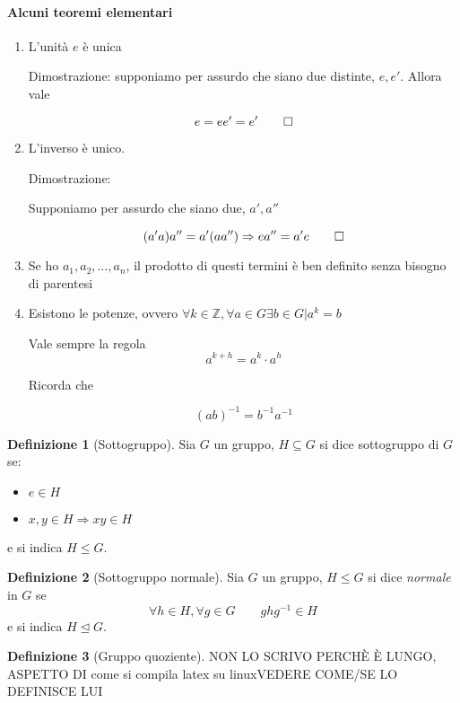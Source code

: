 \documentclass[11pt]{article}
\theoremstyle{plain}
\theoremstyle{definition}
\newtheorem{defn}{Definizione}[section]
\theoremstyle{remark}
\begin{document}
\paragraph{Alcuni teoremi elementari}
\begin{enumerate}
	\item L'unità $e$ è unica
	
	Dimostrazione: supponiamo per assurdo che siano due distinte, $e, e'$. Allora vale
	
	\[e = ee' = e' \qed\]
	
	\item L'inverso è unico.

	Dimostrazione:
	
	Supponiamo per assurdo che siano due, $a', a''$
	
	\[(a' a)a'' = a'(aa'') \Rightarrow e a'' = a' e \qed \]
	
	\item Se ho $a_1, a_2, \ldots, a_n$, il prodotto di questi termini è ben definito senza bisogno di parentesi
	\item Esistono le potenze, ovvero $\forall k \in \mathbb{Z}, \forall a \in G \exists b\in G | a^k = b$
	
	Vale sempre la regola
	\[a^{k+h} = a^k \cdot a^h \]
	
	Ricorda che 
	
	\[ (ab)^{-1} = b^{-1}a^{-1}\]

\end{enumerate}



\begin{defn}[Sottogruppo]
Sia $G$ un gruppo, $H\subseteq G$ si dice sottogruppo di $G$ se:
\begin{itemize}
	\item $e\in H$
	\item $x,y\in H \Rightarrow xy\in H$
\end{itemize}
e si indica $H \leq G$.

\end{defn}

\begin{defn}[Sottogruppo normale]
Sia $G$ un gruppo, $H \leq G$ si dice \textit{normale} in $G$ se
\[
	\forall h\in H, \forall g\in G\qquad ghg^{-1}\in H
\]
e si indica $H \trianglelefteq G$.
\end{defn}

\begin{defn}[Gruppo quoziente]
NON LO SCRIVO PERCHÈ È LUNGO, ASPETTO DI come si compila latex su linuxVEDERE COME/SE LO DEFINISCE LUI
\end{defn}
\end{document}
